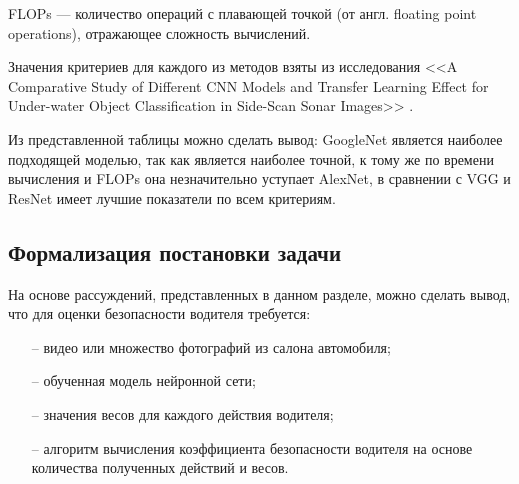 \begin{table}[h]
 	\centering
 	\caption{Сравнение методов распознавания образов}
 	\label{tab:compr}
\end{table}

FLOPs ---  количество операций с плавающей точкой (от англ. floating point operations), отражающее сложность вычислений.

Значения критериев для каждого из методов взяты из исследования <<A Comparative Study of Different CNN Models and Transfer Learning Effect for Under-water Object Classification in Side-Scan Sonar Images>> \cite{models-comprasion}.

Из представленной таблицы можно сделать вывод: GoogleNet является наиболее подходящей моделью, так как является наиболее точной, к тому же по времени вычисления и FLOPs она незначительно уступает AlexNet, в сравнении с VGG и ResNet имеет лучшие показатели по всем критериям.

\subsection{Формализация постановки задачи}
На основе рассуждений, представленных в данном разделе, можно сделать вывод, что для оценки безопасности водителя требуется:
\begin{itemize}[leftmargin=1.6\parindent]
	\item[--] видео или множество фотографий из салона автомобиля;
	\item[--] обученная модель нейронной сети;
	\item[--] значения весов для каждого действия водителя;
	\item[--] алгоритм вычисления коэффициента безопасности водителя на основе количества полученных действий и весов.
\end{itemize}

